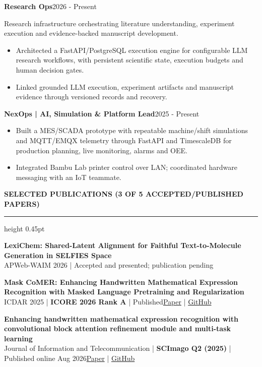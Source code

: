\documentclass[10pt]{article}
\newcommand{\cvsection}[1]{%
    \vspace{6.2pt}%
    {\color{accent}\bfseries\small #1}\par
    \vspace{2.3pt}%
    {\color{rulegray}\hrule height 0.45pt}\vspace{4.0pt}%
}
\newcommand{\entry}[2]{%
    \textbf{#1}\hfill {\color{muted}\small #2}\par
}
\newcommand{\subentry}[1]{%
    {\color{muted}\small #1}\par
}
\begin{document}
\entry{Research Ops}{2026 - Present}
\subentry{Research infrastructure orchestrating literature understanding, experiment execution and evidence-backed manuscript development.}
\begin{itemize}
    \item Architected a FastAPI/PostgreSQL execution engine for configurable LLM research workflows, with persistent scientific state, execution budgets and human decision gates.
    \item Linked grounded LLM execution, experiment artifacts and manuscript evidence through versioned records and recovery.
\end{itemize}

\entry{NexOps | AI, Simulation \& Platform Lead}{2025 - Present}
\begin{itemize}
    \item Built a MES/SCADA prototype with repeatable machine/shift simulations and MQTT/EMQX telemetry through FastAPI and TimescaleDB for production planning, live monitoring, alarms and OEE.
    \item Integrated Bambu Lab printer control over LAN; coordinated hardware messaging with an IoT teammate.
\end{itemize}

\cvsection{SELECTED PUBLICATIONS (3 OF 5 ACCEPTED/PUBLISHED PAPERS)}
\textbf{LexiChem: Shared-Latent Alignment for Faithful Text-to-Molecule Generation in SELFIES Space}\\[-1pt]
{\small APWeb-WAIM 2026 | Accepted and presented; publication pending}\par
\vspace{2.2pt}
\textbf{Mask CoMER: Enhancing Handwritten Mathematical Expression Recognition with Masked Language Pretraining and Regularization}\\[-1pt]
{\small ICDAR 2025 | \textbf{ICORE 2026 Rank A} | Published\hfill \href{https://doi.org/10.1007/978-3-032-04624-6_22}{Paper} | \href{https://github.com/Neeze/Mask-CoMER}{GitHub}}\par
\vspace{2.2pt}
\textbf{Enhancing handwritten mathematical expression recognition with convolutional block attention refinement module and multi-task learning}\\[-1pt]
{\small Journal of Information and Telecommunication | \textbf{SCImago Q2 (2025)} | Published online Aug 2026\hfill \href{https://doi.org/10.1080/24751839.2026.2716432}{Paper} | \href{https://github.com/trungtndev/HMER-CBARM-MTL}{GitHub}}
\end{document}

